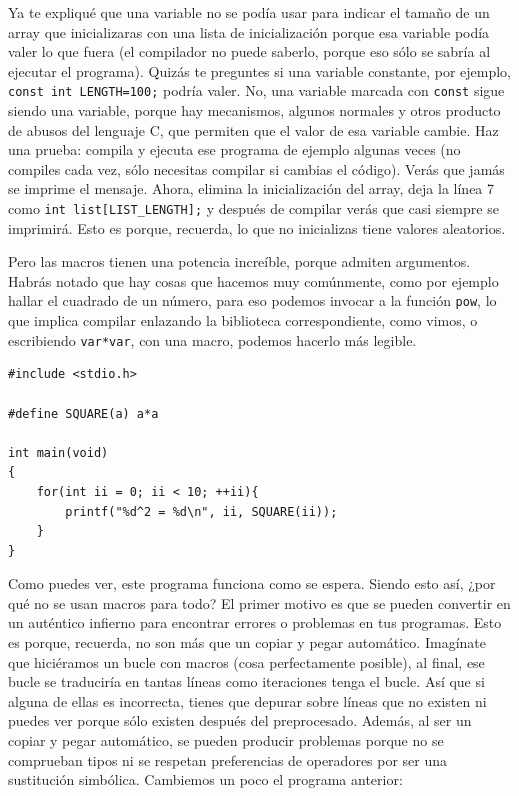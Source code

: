 \documentclass[a4paper]{article}
\begin{document}
Ya te expliqué que una variable no se podía usar para indicar el tamaño de un
array que inicializaras con una lista de inicialización
porque esa variable podía valer lo que fuera (el
compilador no puede saberlo, porque eso sólo se sabría al ejecutar el programa).
Quizás te preguntes si una variable constante, por ejemplo,
\verb!const int LENGTH=100;! podría valer. No, una variable marcada con
\verb!const! sigue siendo una variable, porque hay mecanismos, algunos normales
y otros producto de abusos del lenguaje C, que permiten que el valor de esa
variable cambie. Haz una prueba: compila y ejecuta ese programa de ejemplo
algunas veces (no compiles cada vez, sólo necesitas compilar si cambias el
código). Verás que jamás se imprime el mensaje. Ahora, elimina la inicialización
del array, deja la línea 7 como \verb!int list[LIST_LENGTH];! y después de
compilar verás que casi siempre se imprimirá. Esto es porque, recuerda, lo que
no inicializas tiene valores aleatorios.

Pero las macros tienen una potencia increíble, porque admiten argumentos.
Habrás notado que hay cosas que hacemos muy comúnmente, como por ejemplo hallar
el cuadrado de un número, para eso podemos invocar a la función \verb!pow!, lo
que implica compilar enlazando la biblioteca correspondiente, como vimos, o
escribiendo \verb!var*var!, con una macro, podemos hacerlo más legible.

\noindent
\begin{minipage}[H]{\linewidth}
\mbox{}
\begin{lstlisting}[style=C,
caption={Uso de macro con argumentos},
label={lst:macroWithArguments}]
#include <stdio.h>

#define SQUARE(a) a*a

int main(void)
{
    for(int ii = 0; ii < 10; ++ii){
        printf("%d^2 = %d\n", ii, SQUARE(ii));
    }
}
\end{lstlisting}
\end{minipage}

Como puedes ver, este programa funciona como se espera. Siendo esto así, ¿por
qué no se usan macros para todo? El primer motivo es que se pueden convertir
en un auténtico infierno para encontrar errores o problemas en tus programas.
Esto es porque, recuerda, no son más que un copiar y pegar automático. Imagínate
que hiciéramos un bucle con macros (cosa perfectamente posible), al final, ese
bucle se traduciría en tantas líneas como iteraciones tenga el bucle. Así que si
alguna de ellas es incorrecta, tienes que depurar sobre líneas que no existen ni
puedes ver porque sólo existen después del preprocesado. Además, al ser un
copiar y pegar automático, se pueden producir problemas porque no se comprueban
tipos ni se respetan preferencias de operadores por ser una sustitución
simbólica. Cambiemos un poco el programa anterior:
\end{document}
